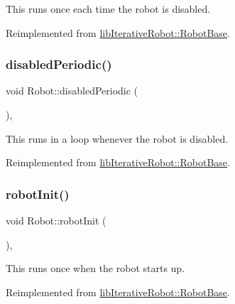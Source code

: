 This runs once each time the robot is disabled. 

Reimplemented from \mbox{\hyperlink{classlib_iterative_robot_1_1_robot_base_a12cfc52a6bac5b5a9ad7e61b47e9ecd2}{lib\+Iterative\+Robot\+::\+Robot\+Base}}.

\mbox{\label{class_robot_a9d35b3c9b4de467c7435d0cc6f17b33b}} 
\subsubsection{\texorpdfstring{disabledPeriodic()}{disabledPeriodic()}}
{\footnotesize\ttfamily void Robot\+::disabled\+Periodic (\begin{DoxyParamCaption}{ }\end{DoxyParamCaption})\hspace{0.3cm}{\ttfamily [protected]}, {\ttfamily [virtual]}}

This runs in a loop whenever the robot is disabled. 

Reimplemented from \mbox{\hyperlink{classlib_iterative_robot_1_1_robot_base_a8e1e85e215343baaaf3bdeedb89d9890}{lib\+Iterative\+Robot\+::\+Robot\+Base}}.

\mbox{\label{class_robot_a0ade19d412e58249d9f7a138d306130c}} 
\subsubsection{\texorpdfstring{robotInit()}{robotInit()}}
{\footnotesize\ttfamily void Robot\+::robot\+Init (\begin{DoxyParamCaption}{ }\end{DoxyParamCaption})\hspace{0.3cm}{\ttfamily [protected]}, {\ttfamily [virtual]}}

This runs once when the robot starts up. 

Reimplemented from \mbox{\hyperlink{classlib_iterative_robot_1_1_robot_base_a1e690e472e901ac99bb7ce6f3b6a33ea}{lib\+Iterative\+Robot\+::\+Robot\+Base}}.

\mbox{\label{class_robot_a8fc4fbb8f758d7223d062e1b4a915232}} 
